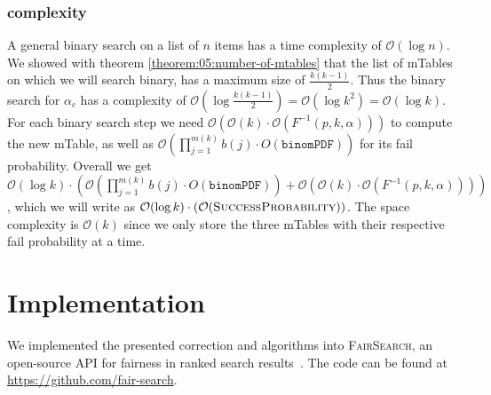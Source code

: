 \subsubsection{\algoBinomBinary complexity}\label{subsubsec:binom-binary-complexity}
A general binary search on a list of $n$ items has a time complexity of $\mathcal{O}(\log{}n)$. We showed with theorem \ref{theorem:05:number-of-mtables} that the list of mTables on which we will search binary, has a maximum size of $\frac{k(k-1)}{2}$.
Thus the binary search for $\alpha_c$ has a complexity of $\mathcal{O}(\log{}\frac{k(k-1)}{2}) = \mathcal{O}(\log{}k^2) = \mathcal{O}(\log{}k)$.
%
For each binary search step we need $\mathcal{O}(\mathcal{O}(k) \cdot \mathcal{O}(F^{-1}(p,k,\alpha)))$ to compute the new mTable, as well as $\mathcal{O}(\prod_{j=1}^{m(k)}b(j) \cdot O(\texttt{binomPDF}))$ for its fail probability.
%
Overall we get $\mathcal{O}(\log{}k) \cdot (\mathcal{O}(\prod_{j=1}^{m(k)}b(j) \cdot O(\texttt{binomPDF})) + \mathcal{O}(\mathcal{O}(k) \cdot \mathcal{O}(F^{-1}(p,k,\alpha))))$, which we will write as $\mathcal{O}(\log{}k) \cdot (\mathcal{O}(\texttt{{\sc SuccessProbability}}))$.
%
The space complexity is $\mathcal{O}(k)$ since we only store the three mTables with their respective fail probability at a time.

\section{Implementation}
We implemented the presented correction and algorithms into \textsc{FairSearch}, an open-source API for fairness in ranked search results~\cite{zehlike2020fairsearch}. 
%
The code can be found at \url{https://github.com/fair-search}.